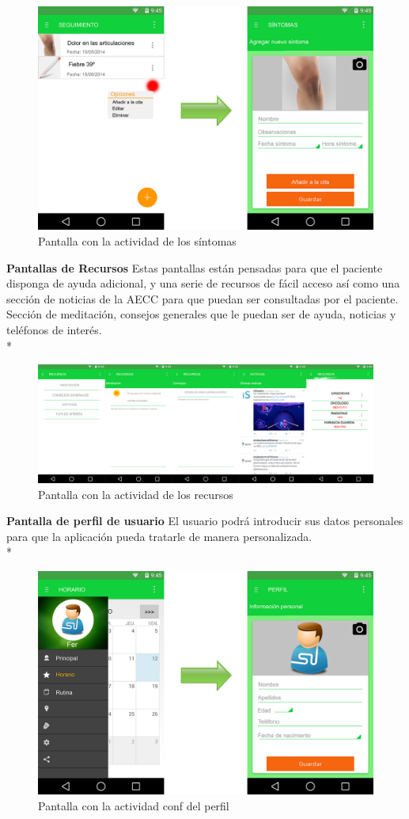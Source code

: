 \documentclass[../pfc.tex]{subfiles}
\begin{document}
			\begin{figure}[h]
				\centering
				\includegraphics[width=0.7\linewidth]{../images/sintomas}
				\caption{Pantalla con la actividad de los síntomas}
				\label{fig:sintomas}
			\end{figure}
			
			
			\textbf{Pantallas de Recursos}
			Estas pantallas están pensadas para que el paciente disponga de ayuda adicional, y una serie de recursos de fácil acceso así como una sección de noticias de la AECC para que puedan ser consultadas por el paciente.
			Sección de meditación, consejos generales que le puedan ser de ayuda, noticias y teléfonos de interés. \\*
			
			\begin{figure}[h]
				\centering
				\includegraphics[width=0.7\linewidth]{../images/recursos}
				\caption{Pantalla con la actividad de los recursos}
				\label{fig:recursos}
			\end{figure}
			
			
			\textbf{Pantalla de perfil de usuario}
			El usuario podrá introducir sus datos personales para que la aplicación pueda tratarle de manera personalizada.\\*
			
			\begin{figure}[h]
				\centering
				\includegraphics[width=0.7\linewidth]{../images/perfil_2}
				\caption{Pantalla con la actividad conf del perfil}
				\label{fig:perfil_2}
			\end{figure}
			
\end{document}
